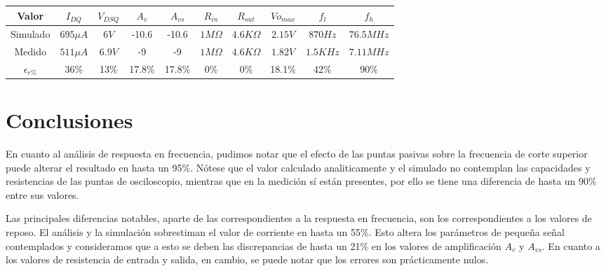 \documentclass[a4paper, 10pt, spanish]{article}
\begin{document}
\begin{center}
  \begin{tabular}{|c|c|c|c|c|c|c|c|c|c|}
    \hline
    Valor & $I_{DQ}$ & $V_{DSQ}$ & $A_v$ & $A_{vs}$ & $R_{in}$ & $R_{out}$ & $V{o_{max}}$ & $f_l$ & $f_h$ \\
    \hline
    Simulado & $695\mu A$ & $6V$ & -10.6 & -10.6 & $1M\Omega$ & $4.6K\Omega$ & $2.15V$ & $870Hz$ & $76.5MHz$ \\
    \hline
    Medido & $511\mu A$ & $6.9V$ & -9 & -9 & $1M\Omega$ & $4.6K\Omega$ & $1.82V$ & $1.5KHz$ & $7.11MHz$ \\
    \hline
    $\epsilon_{r\%}$ & 36\% & 13\% & 17.8\% & 17.8\% & 0\% & 0\% & 18.1\% & 42\% & 90\% \\
    \hline
  \end{tabular}
  \label{tab:comparativo3}
\end{center}

\section{Conclusiones}
	En cuanto al análisis de respuesta en frecuencia, pudimos notar que el efecto de las puntas pasivas sobre la frecuencia de corte superior puede alterar el resultado en hasta un 95\%. Nótese que el valor calculado analiticamente y el simulado no contemplan las capacidades y resistencias de las puntas de osciloscopio, mientras que en la medición sí están presentes, por ello se tiene una diferencia de hasta un 90\% entre sus valores.

  Las principales diferencias notables, aparte de las correspondientes a la respuesta en frecuencia, son los correspondientes a los valores de reposo. El análisis y la simulación sobrestiman el valor de corriente en hasta un 55\%. Esto altera los parámetros de pequeña señal contemplados y consideramos que a esto se deben las discrepancias de hasta un 21\% en los valores de amplificación $A_v$ y $A_{vs}$. En cuanto a los valores de resistencia de entrada y salida, en cambio, se puede notar que los errores son prácticamente nulos.

\end{document}

